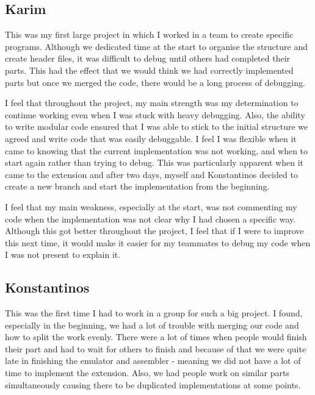\documentclass{article}
\begin{document}
\subsection{Karim} 
This was my first large project in which I worked in a team to create specific programs. Although we dedicated time at the start to organise the structure and create header files, it was difficult to debug until others had completed their parts. This had the effect that we would think we had correctly implemented parts but once we merged the code, there would be a long process of debugging. \\ \par \noindent 
I feel that throughout the project, my main strength was my determination to continue working even when I was stuck with heavy debugging. Also, the ability to write modular code ensured that I was able to stick to the initial structure we agreed and write code that was easily debuggable. I feel I was flexible when it came to knowing that the current implementation was not working, and when to start again rather than trying to debug. This was particularly apparent when it came to the extension and after two days, myself and Konstantinos decided to create a new branch and start the implementation from the beginning. \\ \par \noindent
I feel that my main weakness, especially at the start, was not commenting my code when the implementation was not clear why I had chosen a specific way. Although this got better throughout the project, I feel that if I were to improve this next time, it would make it easier for my teammates to debug my code when I was not present to explain it.


\subsection{Konstantinos }
This was the first time I had to work in a group for such a big project. I found, especially in the beginning, we had a lot of trouble with merging our code and how to split the work evenly. There were a lot of times when people would finish their part and had to wait for others to finish and because of that we were quite late in finishing the emulator and assembler - meaning we did not have a lot of time to implement the extension. Also, we had people work on similar parts simultaneously causing there to be duplicated implementations at some points.\\ \par \noindent
\end{document}
